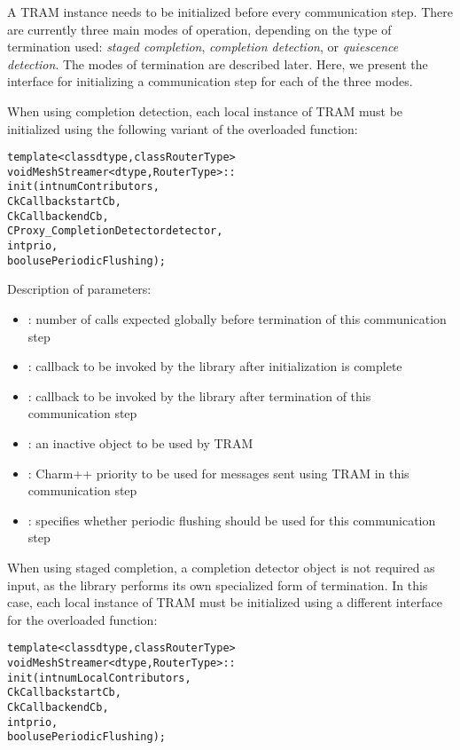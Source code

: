 A TRAM instance needs to be initialized before every communication step. There
are currently three main modes of operation, depending on the type of
termination used: \emph{staged completion}, \emph{completion detection}, or
\emph{quiescence detection}. The modes of termination are described later. Here,
we present the interface for initializing a communication step for each of the
three modes.

When using completion detection, each local instance of TRAM must be initialized
using the following variant of the overloaded  function:

\begin{alltt}
template <class dtype, class RouterType>
void MeshStreamer<dtype, RouterType>::
init(int numContributors,
     CkCallback startCb,
     CkCallback endCb,
     CProxy_CompletionDetector detector,
     int prio,
     bool usePeriodicFlushing);
\end{alltt}

Description of parameters:

\begin{itemize}
\item {}: number of  calls expected globally
  before termination of this communication step
\item {}: callback to be invoked by the library after
  initialization is complete
\item {}: callback to be invoked by the library after termination
  of this communication step
\item {}: an inactive  object to be used by TRAM
\item {}: Charm++ priority to be used for messages sent using TRAM in
  this communication step
\item {}: specifies whether periodic flushing should
  be used for this communication step
\end{itemize}

When using staged completion, a completion detector object is not required as
input, as the library performs its own specialized form of termination. In this
case, each local instance of TRAM must be initialized using a different
interface for the overloaded  function:

\begin{alltt}
template <class dtype, class RouterType>
void MeshStreamer<dtype, RouterType>::
init(int numLocalContributors,
     CkCallback startCb,
     CkCallback endCb,
     int prio,
     bool usePeriodicFlushing);

\end{alltt}

